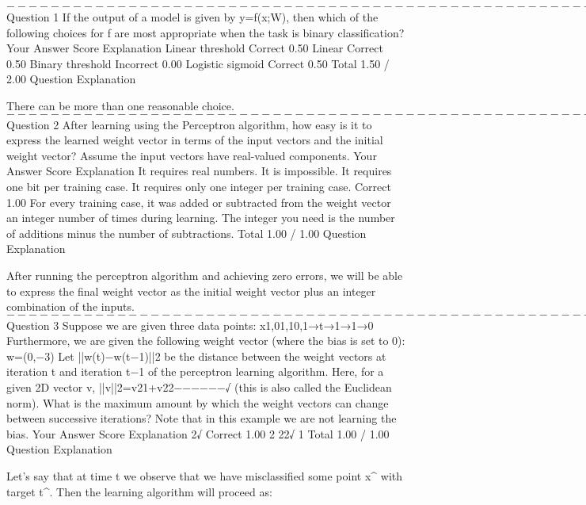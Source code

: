 $----------------------------------------------------------------------------$
Question 1
If the output of a model is given by y=f(x;W), then which of the following choices for f are most appropriate when the task is binary classification?
Your Answer		Score	Explanation
Linear threshold	Correct	0.50	
Linear	Correct	0.50	
Binary threshold	Incorrect	0.00	
Logistic sigmoid	Correct	0.50	
Total		1.50 / 2.00	
Question Explanation

There can be more than one reasonable choice.
$----------------------------------------------------------------------------$
Question 2
After learning using the Perceptron algorithm, how easy is it to express the learned weight vector in terms of the input vectors and the initial weight vector? Assume the input vectors have real-valued components.
Your Answer		Score	Explanation
It requires real numbers.			
It is impossible.			
It requires one bit per training case.			
It requires only one integer per training case.	Correct	1.00	
For every training case, it was added or subtracted from the weight vector an integer number of times during learning. 
The integer you need is the number of additions minus the number of subtractions.
Total		1.00 / 1.00	
Question Explanation

After running the perceptron algorithm and achieving zero errors, we will be able to express the final weight vector as the initial weight vector plus an integer combination of the inputs.
$----------------------------------------------------------------------------$
Question 3
Suppose we are given three data points: 
x1,01,10,1→t→1→1→0 
Furthermore, we are given the following weight vector (where the bias is set to 0): 
w=(0,−3) 
Let ||w(t)−w(t−1)||2 be the distance between the weight vectors at iteration t and iteration t−1 of the perceptron learning algorithm. 
Here, for a given 2D vector v, ||v||2=v21+v22−−−−−−√ (this is also called the Euclidean norm). 
What is the maximum amount by which the weight vectors can change between successive iterations? Note that in this example we are not learning the bias.
Your Answer		Score	Explanation
2√	Correct	1.00	
2			
22√			
1			
Total		1.00 / 1.00	
Question Explanation

Let's say that at time t we observe that we have misclassified some point x^ with target t^. Then the learning algorithm will proceed as: 

